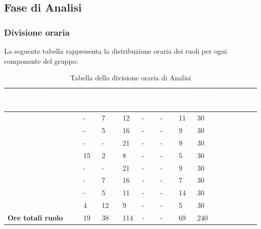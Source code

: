 \subsection{Fase di Analisi}

\subsubsection{Divisione oraria}
La seguente tabella rappresenta la distribuzione oraria dei ruoli per ogni componente del gruppo:
{
\renewcommand{\arraystretch}{2}
\begin{longtable}[h!] { C{4cm} C{1cm} C{1cm} C{1cm} C{1cm} C{1cm} C{1cm} C{3cm}}
\caption{Tabella della divisione oraria di Analisi}	\\

\textcolor{white}{\textbf{Membro del gruppo}} & 
\textcolor{white}{\textbf{RE}} & 
\textcolor{white}{\textbf{AM}} & 
\textcolor{white}{\textbf{AN}} & 
\textcolor{white}{\textbf{PT}} & 
\textcolor{white}{\textbf{PR}} & 
\textcolor{white}{\textbf{VE}} & 
\textcolor{white}{\textbf{Ore complessive}}\\	
\endhead

\MC{}                     &  - &  7 &  12 & - & - & 11 &  30 \\
\LD{}                     &  - &  5 &  16 & - & - &  9 &  30 \\
\CE{}                     &  - &  - &  21 & - & - &  9 &  30 \\
\SE{}                     & 15 &  2 &   8 & - & - &  5 &  30 \\
\PF{}                     &  - &  - &  21 & - & - &  9 &  30 \\
\DF{}                     &  - &  7 &  16 & - & - &  7 &  30 \\
\BR{}                     &  - &  5 &  11 & - & - & 14 &  30 \\
\AT{}                     &  4 & 12 &   9 & - & - &  5 &  30 \\
\textbf{Ore totali ruolo} & 19 & 38 & 114 & - & - & 69 & 240 \\

\end{longtable}
}

